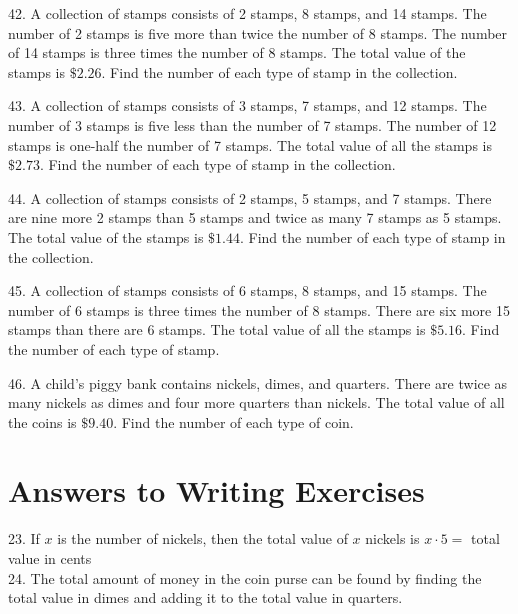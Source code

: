 \documentclass{ximera}
\begin{document}
\begin{exercise}
42. A collection of stamps consists of 2\textcent{} stamps, 8\textcent{} stamps, and 14\textcent{} stamps. The number of 2\textcent{} stamps is five more than twice the number of 8\textcent{} stamps. The number of 14\textcent{} stamps is three times the number of 8\textcent{} stamps. The total value of the stamps is $\$ 2.26$. Find the number of each type of stamp in the collection.
\end{exercise}

\begin{exercise}
43. A collection of stamps consists of 3\textcent{} stamps, 7\textcent{} stamps, and 12\textcent{} stamps. The number of 3\textcent{} stamps is five less than the number of 7\textcent{} stamps. The number of 12\textcent{} stamps is one-half the number of 7\textcent{} stamps. The total value of all the stamps is $\$ 2.73$. Find the number of each type of stamp in the collection.
\end{exercise}

\begin{exercise}
44. A collection of stamps consists of 2\textcent{} stamps, 5\textcent{} stamps, and 7\textcent{} stamps. There are nine more 2\textcent{} stamps than 5\textcent{} stamps and twice as many 7\textcent{} stamps as 5\textcent{} stamps. The total value of the stamps is $\$ 1.44$. Find the number of each type of stamp in the collection.
\end{exercise}

\begin{exercise}
45. A collection of stamps consists of 6\textcent{} stamps, 8\textcent{} stamps, and 15\textcent{} stamps. The number of 6\textcent{} stamps is three times the number of 8\textcent{} stamps. There are six more 15\textcent{} stamps than there are 6\textcent{} stamps. The total value of all the stamps is $\$ 5.16$. Find the number of each type of stamp.
\end{exercise}

\begin{exercise}
46. A child's piggy bank contains nickels, dimes, and quarters. There are twice as many nickels as dimes and four more quarters than nickels. The total value of all the coins is $\$ 9.40$. Find the number of each type of coin.
\end{exercise}

\section*{Answers to Writing Exercises}
23. If $x$ is the number of nickels, then the total value of $x$ nickels is $x \cdot 5=$ total value in cents\\
24. The total amount of money in the coin purse can be found by finding the total value in dimes and adding it to the total value in quarters.
\end{document}

